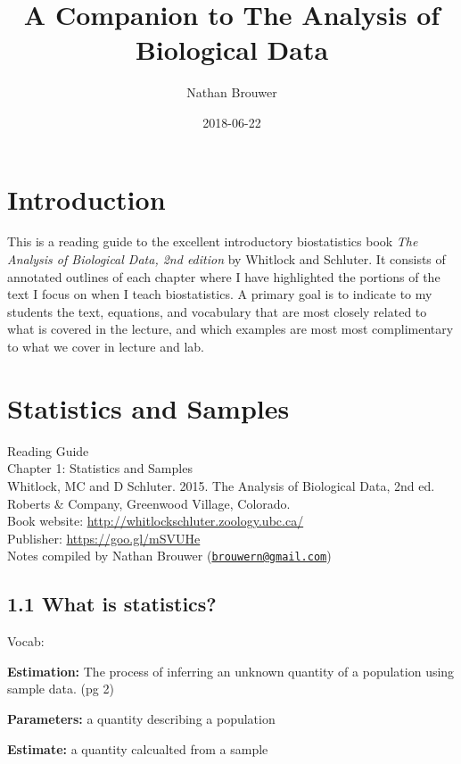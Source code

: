 \documentclass[]{book}
\title{A Companion to The Analysis of Biological Data}
\author{Nathan Brouwer}
\date{2018-06-22}
\theoremstyle{definition}
\theoremstyle{definition}
\theoremstyle{definition}
\theoremstyle{remark}
\begin{document}
\maketitle

{
\setcounter{tocdepth}{1}
\tableofcontents
}
\chapter*{Introduction}\label{introduction}

This is a reading guide to the excellent introductory biostatistics book
\emph{The Analysis of Biological Data, 2nd edition} by Whitlock and
Schluter. It consists of annotated outlines of each chapter where I have
highlighted the portions of the text I focus on when I teach
biostatistics. A primary goal is to indicate to my students the text,
equations, and vocabulary that are most closely related to what is
covered in the lecture, and which examples are most most complimentary
to what we cover in lecture and lab.

\chapter{Statistics and Samples}\label{statistics-and-samples}

Reading Guide\\
Chapter 1: Statistics and Samples\\
Whitlock, MC and D Schluter. 2015. The Analysis of Biological Data, 2nd
ed. Roberts \& Company, Greenwood Village, Colorado.\\
Book website: \url{http://whitlockschluter.zoology.ubc.ca/}\\
Publisher: \url{https://goo.gl/mSVUHe}\\
Notes compiled by Nathan Brouwer
(\href{mailto:brouwern@gmail.com}{\nolinkurl{brouwern@gmail.com}})

\section{1.1 What is statistics?}\label{what-is-statistics}

Vocab:

\textbf{Estimation:} The process of inferring an unknown quantity of a
population using sample data. (pg 2)

\textbf{Parameters:} a quantity describing a population

\textbf{Estimate:} a quantity calcualted from a sample
\end{document}
